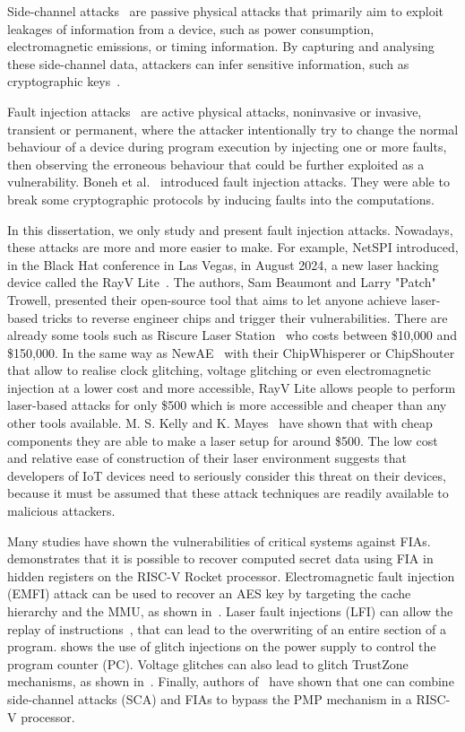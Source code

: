 Side-channel attacks~\cite{DM-21-appiot} are passive physical attacks that primarily aim to exploit leakages of information from a device, such as power consumption, electromagnetic emissions, or timing information. By capturing and analysing these side-channel data, attackers can infer sensitive information, such as cryptographic keys~\cite{K-96-crypto}.

Fault injection attacks~\cite{BCNTW-06-procieee, BBKN-12-procieee, YSW-18-hss} are active physical attacks, noninvasive or invasive, transient or permanent, where the attacker intentionally try to change the normal behaviour of a device during program execution by injecting one or more faults, then observing the erroneous behaviour that could be further exploited as a vulnerability. Boneh et al.~\cite{BDL-97-eurocrypt} introduced fault injection attacks. They were able to break some cryptographic protocols by inducing faults into the computations.

In this dissertation, we only study and present fault injection attacks. Nowadays, these attacks are more and more easier to make. For example, NetSPI introduced, in the Black Hat conference in Las Vegas, in August 2024, a new laser hacking device called the RayV Lite~\cite{rayvlite_wired}. The authors, Sam Beaumont and Larry "Patch" Trowell, presented their open-source tool that aims to let anyone achieve laser-based tricks to reverse engineer chips and trigger their vulnerabilities. There are already some tools such as Riscure Laser Station~\cite{riscure_station} who costs between \$10,000 and \$150,000. In the same way as NewAE~\cite{chipwhisperer, chipshouter} with their ChipWhisperer or ChipShouter that allow to realise clock glitching, voltage glitching or even electromagnetic injection at a lower cost and more accessible, RayV Lite allows people to perform laser-based attacks for only \$500 which is more accessible and cheaper than any other tools available. M. S. Kelly and K. Mayes~\cite{KM-20-host} have shown that with cheap components they are able to make a laser setup for around \$500. The low cost and relative ease of construction of their laser environment suggests that developers of IoT devices need to seriously consider this threat on their devices, because it must be assumed that these attack techniques are readily available to malicious attackers.

Many studies have shown the vulnerabilities of critical systems against FIAs.
\cite{LBDP-19-date} demonstrates that it is possible to recover computed secret data using FIA in hidden registers on the RISC-V Rocket processor. 
Electromagnetic fault injection (EMFI) attack can be used to recover an AES key by targeting the cache hierarchy and the MMU, as shown in~\cite{TBELB-21-jce}.
Laser fault injections (LFI) can allow the replay of instructions~\cite{KDD-21-dsd}, that can lead to the overwriting of an entire section of a program.
\cite{TSW-16-fdtc} shows the use of glitch injections on the power supply to control the program counter (PC). Voltage glitches can also lead to glitch TrustZone mechanisms, as shown in~\cite{SMS-23-usenix}.
Finally, authors of~\cite{NSUH-21-tches} have shown that one can combine side-channel attacks (SCA) and FIAs to bypass the PMP mechanism in a RISC-V processor.

